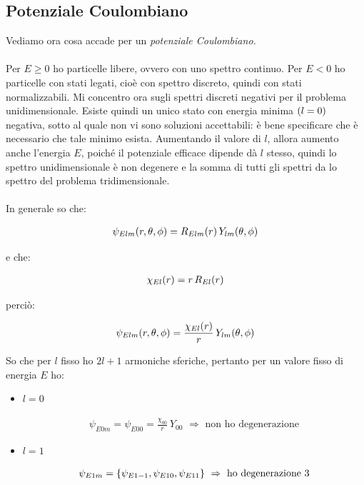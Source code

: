 \subsection{Potenziale Coulombiano}

	Vediamo ora cosa accade per un \textit{potenziale Coulombiano.}
	\\
	\\
	Per $E \geq 0$ ho particelle libere, ovvero con uno spettro continuo. Per $E < 0$ ho particelle con stati legati, cioè con spettro discreto, quindi con stati normalizzabili. Mi concentro ora sugli spettri discreti negativi per il problema unidimensionale. Esiste quindi un unico stato con energia minima $\qty(l = 0)$ negativa, sotto al quale non vi sono soluzioni accettabili: è bene specificare che è necessario che tale minimo esista. Aumentando il valore di $l$, allora aumento anche l'energia $E$, poiché il potenziale efficace dipende dà $l$ stesso, quindi lo spettro unidimensionale è non degenere e la somma di tutti gli spettri da lo spettro del problema tridimensionale.
	\\
	\\
	In generale so che:
	
\begin{align*}
	\psi_{Elm}\qty(r, \theta, \phi) = R_{Elm}\qty(r) \, Y_{lm}\qty(\theta, \phi)
\end{align*}

	e che:
	
\begin{align*}	
	\chi_{El} \qty(r) = r \, R_{El}\qty(r)
\end{align*}

	perciò:
	
\begin{align*}
	\psi_{Elm} \qty(r, \theta, \phi) = \frac{\chi_{El}\qty(r)}{r} \, Y_{lm}\qty(\theta, \phi)
\end{align*}
	
	So che per $l$ fisso ho $2l + 1$ armoniche sferiche, pertanto per un valore fisso di energia $E$ ho:
	
\begin{itemize}
	\item $l = 0$
		
	\begin{align*}
		\psi_{E0m} = \psi_{E00} = \frac{\chi_{00}}{r} \, Y_{00} \, \, \Rightarrow \, \, \text{non ho degenerazione}
	\end{align*}

	\item $l = 1$
	
	\begin{align*}
		\psi_{E1m} = \qty{ \psi_{E1-1}, \psi_{E10}, \psi_{E11}} \, \, \Rightarrow \, \, \text{ho degenerazione $3$}
	\end{align*}
	
\end{itemize}

